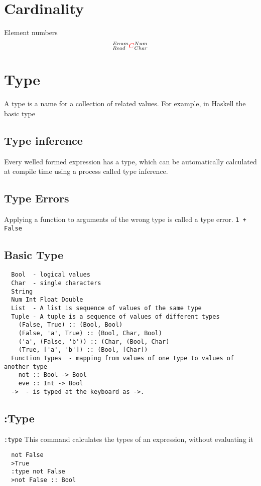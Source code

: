 \documentclass[a4paper,12pt]{article}
\theoremstyle{definition}
\begin{document}
\section{Cardinality} Element numbers
  \begin{equation}
    ^{Enum}_{Read}{\color{red}{C}}^{Num}_{Char}
  \end{equation}

\section{Type} A type is a name for a collection of related values. For example, in Haskell the basic type

\subsection{Type inference} Every welled formed expression has a type, which can be automatically calculated at compile time using a process called type inference.

\subsection*{Type Errors} Applying a function to arguments of the wrong type is called a type error. 
\lstinline!1 + False!

\subsection{Basic Type}
\begin{lstlisting}
  Bool  - logical values 
  Char  - single characters 
  String 
  Num Int Float Double
  List  - A list is sequence of values of the same type
  Tuple - A tuple is a sequence of values of different types
    (False, True) :: (Bool, Bool)
    (False, 'a', True) :: (Bool, Char, Bool)
    ('a', (False, 'b')) :: (Char, (Bool, Char)
    (True, ['a', 'b']) :: (Bool, [Char]) 
  Function Types  - mapping from values of one type to values of another type
    not :: Bool -> Bool
    eve :: Int -> Bool
  ->  - is typed at the keyboard as ->.
\end{lstlisting}

\subsection{:Type} \lstinline!:type! This command calculates the types of an expression, without evaluating it
\begin{lstlisting}
  not False 
  >True 
  :type not False 
  >not False :: Bool
\end{lstlisting}
\end{document}
